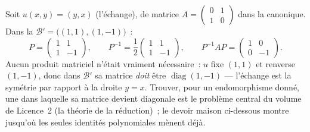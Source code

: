 \begin{example}
\label{ex:b1:matrices:conjugationrun}
Soit $u(x, y) = (y, x)$ (l'échange), de matrice $A = \begin{pmatrix} 0
& 1\\ 1 & 0\end{pmatrix}$ dans la  canonique. Dans la 
$\mathcal B' = \bigl((1,1), (1,-1)\bigr)$~:
\[
P = \begin{pmatrix} 1 & 1\\ 1 & -1 \end{pmatrix},
\qquad
P^{-1} = \frac12\begin{pmatrix} 1 & 1\\ 1 & -1 \end{pmatrix},
\qquad
P^{-1} A P = \begin{pmatrix} 1 & 0\\ 0 & -1 \end{pmatrix}.
\]
Aucun produit matriciel n'était vraiment nécessaire~: $u$ fixe $(1,1)$
et renverse $(1,-1)$, donc dans $\mathcal B'$ sa matrice \emph{doit}
être $\operatorname{diag}(1, -1)$ --- l'échange est la symétrie par
rapport à la droite $y = x$. Trouver, pour un endomorphisme donné, une
 dans laquelle sa matrice devient diagonale est le problème central
du volume de Licence~2 (la théorie de la réduction)~; le devoir maison
ci-dessous montre jusqu'où les seules identités polynomiales mènent
déjà.
\end{example}

